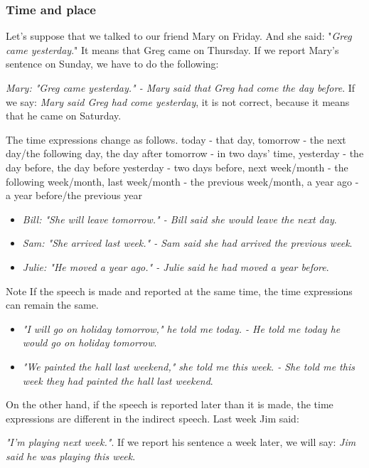 \subsubsection{Time and place}

Let's suppose that we talked to our friend Mary on Friday. And she said: "\textit{Greg came yesterday}." It means that Greg came on Thursday. If we report Mary's sentence on Sunday, we have to do the following: 

\textit{Mary: "Greg came yesterday." - Mary said that Greg had come the day before}.
If we say: \textit{Mary said Greg had come yesterday}, it is not correct, because it means that he came on Saturday. 

The time expressions change as follows. today - that day, tomorrow - the next day/the following day, the day after tomorrow - in two days' time, yesterday - the day before, the day before yesterday - two days before, next week/month - the following week/month, last week/month - the previous week/month, a year ago - a year before/the previous year 

\begin{itemize}
\item \textit{Bill: "She will leave tomorrow." - Bill said she would leave the next day}.
\item \textit{Sam: "She arrived last week." - Sam said she had arrived the previous week}.
\item \textit{Julie: "He moved a year ago." - Julie said he had moved a year before}.
\end{itemize}

Note If the speech is made and reported at the same time, the time expressions can remain the same. 

\begin{itemize}
\item \textit{"I will go on holiday tomorrow," he told me today. - He told me today he would go on holiday tomorrow}.
\item \textit{"We painted the hall last weekend," she told me this week. - She told me this week they had painted the hall last weekend}.
\end{itemize}

On the other hand, if the speech is reported later than it is made, the time expressions are different in the indirect speech. Last week Jim said: 

\textit{"I'm playing next week."}. If we report his sentence a week later, we will say: \textit{Jim said he was playing this week}. 

